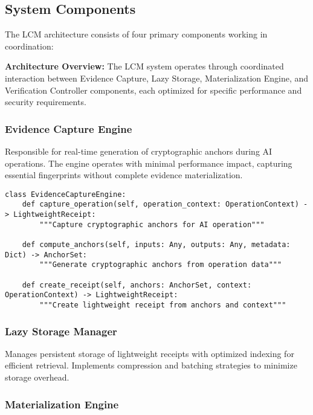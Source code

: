 \documentclass[12pt,a4paper]{article}
\begin{document}
\subsection{System Components}

The LCM architecture consists of four primary components working in coordination:

\begin{technicalbox}
\textbf{Architecture Overview:} The LCM system operates through coordinated interaction between Evidence Capture, Lazy Storage, Materialization Engine, and Verification Controller components, each optimized for specific performance and security requirements.
\end{technicalbox}

\subsubsection{Evidence Capture Engine}

Responsible for real-time generation of cryptographic anchors during AI operations. The engine operates with minimal performance impact, capturing essential fingerprints without complete evidence materialization.

\begin{lstlisting}[caption={Evidence Capture Engine Interface}]
class EvidenceCaptureEngine:
    def capture_operation(self, operation_context: OperationContext) -> LightweightReceipt:
        """Capture cryptographic anchors for AI operation"""

    def compute_anchors(self, inputs: Any, outputs: Any, metadata: Dict) -> AnchorSet:
        """Generate cryptographic anchors from operation data"""

    def create_receipt(self, anchors: AnchorSet, context: OperationContext) -> LightweightReceipt:
        """Create lightweight receipt from anchors and context"""
\end{lstlisting}

\subsubsection{Lazy Storage Manager}

Manages persistent storage of lightweight receipts with optimized indexing for efficient retrieval. Implements compression and batching strategies to minimize storage overhead.

\subsubsection{Materialization Engine}
\end{document}

